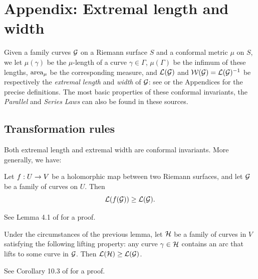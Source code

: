 
\section{Appendix: Extremal length and width}


Given a family curves ${\mathcal G}$ on a Riemann surface $S$ and a conformal metric $\mu$ on $S$,
we let $\mu(\gamma)$ be the $\mu$-length of a curve $\gamma\in \Gamma$,
$\mu(\Gamma)$ be the infimum of these lengths,
$\operatorname{area}_\mu$ be the corresponding measure, and
 ${\mathcal L}({\mathcal G})$ and ${\mathcal W}({\mathcal G})={\mathcal L}({\mathcal G})^{-1}$ be respectively the {\it extremal length} and {\it width} of ${\mathcal G}$:
see \cite{A} or the Appendices \cite{covering lemma,K} for the precise definitions.
The most basic properties of these conformal invariants, the {\it Parallel} and {\it Series Laws} can
also be found in these sources.


\subsection{Transformation rules}
 Both extremal length and extremal width  are conformal invariants.
 More generally, we have:

\begin{lem}\label{increase}
   Let $f: U\rightarrow V$ be a holomorphic map between two Riemann surfaces,
and let ${\mathcal G}$ be a family of curves on $U$. Then
$$
      {\mathcal L}(f({\mathcal G}))\geq {\mathcal L}({\mathcal G}).
$$
\end{lem}

 See Lemma 4.1 of \cite{covering lemma} for a proof.

\begin{cor}\label{two families}
     Under the circumstances of the previous lemma,
let ${\mathcal H}$ be a family of curves in $V$ satisfying the following lifting
property: any curve $\gamma\in {\mathcal H}$ contains an arc that lifts to some curve
in ${\mathcal G}$. Then ${\mathcal L}({\mathcal H})\geq {\mathcal L}({\mathcal G})$.
\end{cor}

 See Corollary 10.3 of \cite{K} for a proof.



